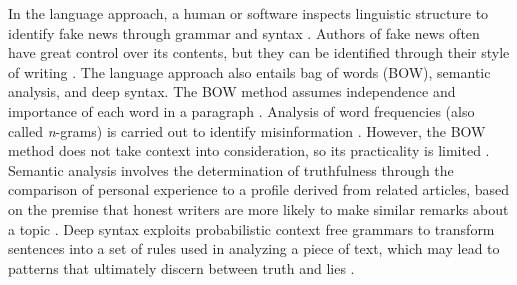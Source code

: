 In the language approach, a human or software inspects linguistic structure to identify fake news through grammar and syntax \cite{burkhardt2017history}. Authors of fake news often have great control over its contents, but they can be identified through their style of writing \cite{yang2018ti-cnn}. The language approach also entails bag of words (BOW), semantic analysis, and deep syntax. The BOW method assumes independence and importance of each word in a paragraph \cite{burkhardt2017history}. Analysis of word frequencies (also called \textit{n}-grams) is carried out to identify misinformation \cite{thota2018fake}. However, the BOW method does not take context into consideration, so its practicality is limited \cite{potthast2017stylometric}. Semantic analysis involves the determination of truthfulness through the comparison of personal experience to a profile derived from related articles, based on the premise that honest writers are more likely to make similar remarks about a topic \cite{chen2015news}. Deep syntax exploits probabilistic context free grammars to transform sentences into a set of rules used in analyzing a piece of text, which may lead to patterns that ultimately discern between truth and lies \cite{zhou2020survey, Stahl2018FakeND}.

